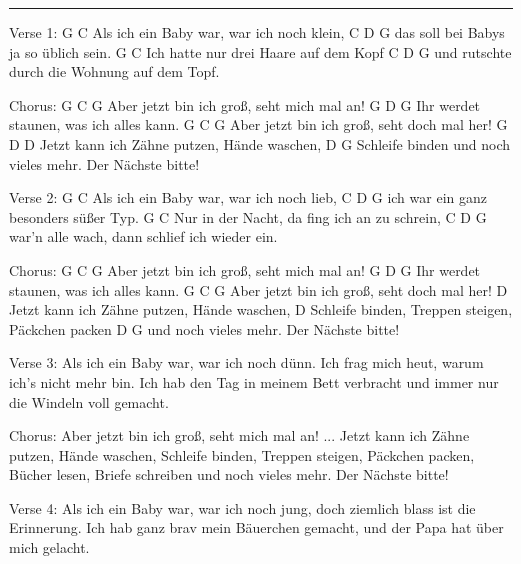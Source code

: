 \noindent\rule{\columnwidth}{1pt}

\begin{multicols}{2}
\begin{lstsong}
Verse 1:
G                                  C
Als ich ein Baby war, war ich noch klein,
C            D                  G
das soll bei Babys ja so üblich sein.
G                                 C
Ich hatte nur drei Haare auf dem Kopf
C            D                        G
und rutschte durch die Wohnung auf dem Topf.

Chorus:
G      C                                G
Aber jetzt bin ich groß, seht mich mal an!
G           D                     G
Ihr werdet staunen, was ich alles kann.
G      C                               G
Aber jetzt bin ich groß, seht doch mal her!
G               D            D
Jetzt kann ich Zähne putzen, Hände waschen,
D                               G
Schleife binden und noch vieles mehr.
Der Nächste bitte!

Verse 2:
G                                  C
Als ich ein Baby war, war ich noch lieb,
C           D                     G
ich war ein ganz besonders süßer Typ.
G                                   C
Nur in der Nacht, da fing ich an zu schrein,
C          D                              G
war'n alle wach, dann schlief ich wieder ein.
 
Chorus:
G      C                                G
Aber jetzt bin ich groß, seht mich mal an!
G           D                     G
Ihr werdet staunen, was ich alles kann.
G      C                               G
Aber jetzt bin ich groß, seht doch mal her!
D
Jetzt kann ich Zähne putzen, Hände waschen,
D
Schleife binden, Treppen steigen, Päckchen packen
D                G
und noch vieles mehr.
Der Nächste bitte!
\end{lstsong}\vfill\columnbreak\begin{lstsong}
Verse 3:
Als ich ein Baby war, war ich noch dünn.
Ich frag mich heut, warum ich's nicht mehr bin.
Ich hab den Tag in meinem Bett verbracht
und immer nur die Windeln voll gemacht.

Chorus:
Aber jetzt bin ich groß, seht mich mal an! ...
Jetzt kann ich Zähne putzen, Hände waschen,
Schleife binden, Treppen steigen, Päckchen packen,
Bücher lesen, Briefe schreiben
und noch vieles mehr.        Der Nächste bitte!

Verse 4:
Als ich ein Baby war, war ich noch jung,
doch ziemlich blass ist die Erinnerung.
Ich hab ganz brav mein Bäuerchen gemacht,
und der Papa hat über mich gelacht.


\end{lstsong}
\end{multicols}
